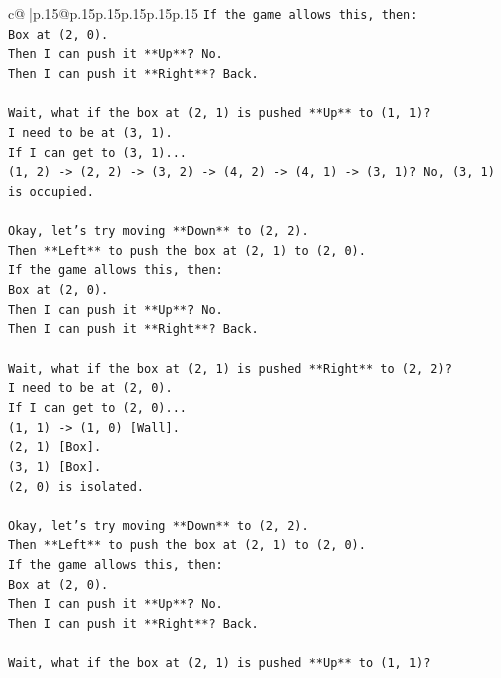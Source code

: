 \documentclass{article}
\begin{document}
{\begin{supertabular}{c@{$\;$}|p{.15\linewidth}@{}p{.15\linewidth}p{.15\linewidth}p{.15\linewidth}p{.15\linewidth}p{.15\linewidth}}
{{{\texttt{If the game allows this, then:} \\
\texttt{Box at (2, 0).} \\
\texttt{Then I can push it **Up**? No.} \\
\texttt{Then I can push it **Right**? Back.} \\
\\ 
\texttt{Wait, what if the box at (2, 1) is pushed **Up** to (1, 1)?} \\
\texttt{I need to be at (3, 1).} \\
\texttt{If I can get to (3, 1)...} \\
\texttt{(1, 2) {-}> (2, 2) {-}> (3, 2) {-}> (4, 2) {-}> (4, 1) {-}> (3, 1)? No, (3, 1) is occupied.} \\
\\ 
\texttt{Okay, let's try moving **Down** to (2, 2).} \\
\texttt{Then **Left** to push the box at (2, 1) to (2, 0).} \\
\texttt{If the game allows this, then:} \\
\texttt{Box at (2, 0).} \\
\texttt{Then I can push it **Up**? No.} \\
\texttt{Then I can push it **Right**? Back.} \\
\\ 
\texttt{Wait, what if the box at (2, 1) is pushed **Right** to (2, 2)?} \\
\texttt{I need to be at (2, 0).} \\
\texttt{If I can get to (2, 0)...} \\
\texttt{(1, 1) {-}> (1, 0) {[}Wall{]}.} \\
\texttt{(2, 1) {[}Box{]}.} \\
\texttt{(3, 1) {[}Box{]}.} \\
\texttt{(2, 0) is isolated.} \\
\\ 
\texttt{Okay, let's try moving **Down** to (2, 2).} \\
\texttt{Then **Left** to push the box at (2, 1) to (2, 0).} \\
\texttt{If the game allows this, then:} \\
\texttt{Box at (2, 0).} \\
\texttt{Then I can push it **Up**? No.} \\
\texttt{Then I can push it **Right**? Back.} \\
\\ 
\texttt{Wait, what if the box at (2, 1) is pushed **Up** to (1, 1)?} \\
}}}
\end{supertabular}}
\end{document}

